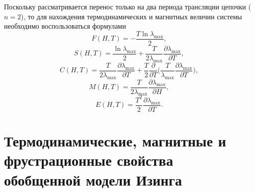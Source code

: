 Поскольку рассматривается перенос только на два периода трансляции цепочки ($n = 2$), то для нахождения термодинамических и магнитных величин системы необходимо воспользоваться формулами
\begin{equation}
F(H,T)=-\frac{T \ln \lambda_{\text{max}}}{2},
\end{equation}
\begin{equation}
S(H,T)=\frac{\ln \lambda_{\text{max}}}{2}+\frac{T}{2\lambda_{\text{max}}}\frac{\partial \lambda_{\text{max}}}{\partial T},
\end{equation}
\begin{equation}
C(H,T)=\frac{T}{2\lambda_{\text{max}}}\frac{\partial \lambda_{\text{max}}}{\partial T} + \frac{T}{2}\frac{\partial }{\partial T}\bigg(\frac{T}{\lambda_{\text{max}}}\frac{\partial \lambda_{\text{max}}}{\partial T}\bigg),
\end{equation}
\begin{equation}
M(H,T)=\frac{T}{2\lambda_{\text{max}}}\frac{\partial \lambda_{\text{max}}}{\partial H},
\end{equation}
\begin{equation}
E(H,T)=\frac{T^2}{2}\frac{\partial \lambda_{\text{max}}}{\partial T}.
\end{equation}


\section{Термодинамические, магнитные и фрустрационные свойства обобщенной модели Изинга}\label{sec:ch2/vector}

